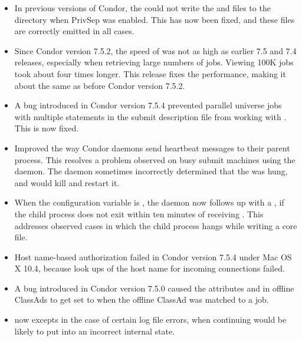\begin{itemize}

\item In previous versions of Condor, the  could not 
write the  and  files to the 
directory when PrivSep was enabled.  This has now been fixed, and these files
are correctly emitted in all cases.

\item Since Condor version 7.5.2, the speed of  was not as high
  as earlier 7.5 and 7.4 releases,
  especially when retrieving large numbers of jobs.
  Viewing 100K jobs took about four times longer.
  This release fixes the performance,
  making it about the same as before Condor version 7.5.2.

\item A bug introduced in Condor version 7.5.4 prevented parallel 
universe jobs with multiple  statements in 
the submit description file from working with .
This is now fixed.

\item Improved the way Condor daemons send heartbeat messages to their parent
process.  This resolves a problem observed on busy submit machines using the
 daemon.  The  daemon sometimes incorrectly
determined that the  was hung, and would kill and restart it.

\item When the configuration variable 
is ,
the  daemon now follows up with a ,
if the child process does not exit within ten minutes of receiving
.
This addresses observed cases in
which the child process hangs while writing a core file.

\item Host name-based authorization failed in Condor version 7.5.4
under Mac OS X 10.4,
because look ups of the host name for incoming connections failed.

\item A bug introduced in Condor version 7.5.0 caused
the attributes  and 
in offline ClassAds to get set to 
when the offline ClassAd was matched to a job.

\item {} now excepts in the case of certain log file errors,
when continuing would be likely to put  into an incorrect 
internal state.


\end{itemize}
